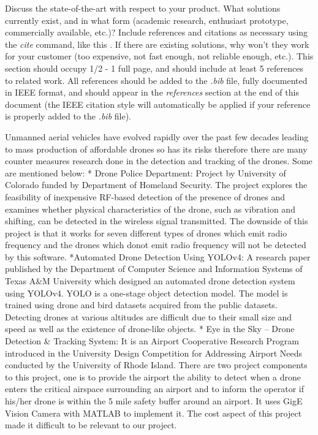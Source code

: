Discuss the state-of-the-art with respect to your product. What solutions currently exist, and in what form (academic research, enthusiast prototype, commercially available, etc.)? Include references and citations as necessary using the \textit{cite} command, like this \cite{Rubin2012}. If there are existing solutions, why won't they work for your customer (too expensive, not fast enough, not reliable enough, etc.). This section should occupy 1/2 - 1 full page, and should include at least 5 references to related work. All references should be added to the \textit{.bib} file, fully documented in IEEE format, and should appear in the \textit{references} section at the end of this document (the IEEE citation style will automatically be applied if your reference is properly added to the \textit{.bib} file).


Unmanned aerial vehicles have evolved rapidly over the past few decades leading to mass production of affordable drones so has its risks therefore there are many counter measures research done in the detection and tracking of the drones. Some are mentioned below: 
* Drone Police Department: Project by University of Colorado funded by Department of Homeland Security. The project explores the feasibility of inexpensive RF-based detection of the presence of drones and examines whether physical characteristics of the drone, such as vibration and shifting, can be detected in the wireless signal transmitted. The downside of this project is that it works for seven different types of drones which emit radio frequency and the drones which donot emit radio frequency will not be detected by this software. \cite{http://mnslab.org/DronePD.html} 
*Automated Drone Detection Using YOLOv4: A research paper published by the Department of Computer Science and Information Systems of Texas A&M University which designed an automated drone detection system using YOLOv4. YOLO is a one-stage object detection model. The model is trained using drone and bird datasets acquired from the public datasets. Detecting drones at various altitudes are difficult due to their small size and speed as well as the existence of drone-like objects. \cite{https://www.mdpi.com/2504-446X/5/3/95/htm}
* Eye in the Sky – Drone Detection & Tracking System:  It is an Airport Cooperative Research Program introduced in the University Design Competition for Addressing Airport Needs conducted by the University of Rhode Island. There are two project components to this project, one is to provide the airport the ability to detect when a drone enters the critical airspace surrounding an airport and to inform the operator if his/her drone is within the 5 mile safety buffer around an airport.  It uses GigE Vision Camera with MATLAB to implement it. The cost aspect of this project made it difficult to be relevant to our project. \cite{https://vsgc.odu.edu/acrpdesigncompetition/wp-content/uploads/sites/3/2018/11/Runway_First-Place_URI_Nassersharif_Bahram.pdf}
